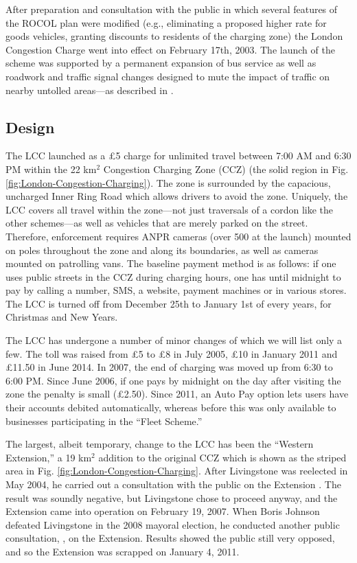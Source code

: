 After preparation and consultation with the public in which several features of the ROCOL plan were modified (e.g., eliminating a proposed higher rate for goods vehicles, granting discounts to residents of the charging zone) the London Congestion Charge went into effect on February 17th, 2003. The launch of the scheme was supported by a permanent expansion of bus service as well as roadwork and traffic signal changes designed to mute the impact of traffic on nearby untolled areas---as described in \cite[p. 132-135]{Richards2006}.

\subsection{Design}

The LCC launched as a \pounds5 charge for unlimited travel between 7:00 AM and 6:30 PM within the 22 km$^{2}$ Congestion Charging Zone (CCZ) (the solid region in Fig. \ref{fig:London-Congestion-Charging}). The zone is surrounded by the capacious, uncharged Inner Ring Road which allows drivers to avoid the zone. Uniquely, the LCC covers all travel within the zone---not just traversals of a cordon like the other schemes---as well as vehicles that are merely parked on the street. Therefore, enforcement requires ANPR cameras (over 500 at the launch) mounted on poles throughout the zone and along its boundaries, as well as cameras mounted on patrolling vans. The baseline payment method is as follows: if one uses public streets in the CCZ during charging hours, one has until midnight to pay by calling a number, SMS, a website, payment machines or in various stores. The LCC is turned off from December 25th to January 1st of every years, for Christmas and New Years.

The LCC has undergone a number of minor changes of which we will list only a few. The toll was raised from \pounds5 to \pounds8 in July 2005, \pounds10 in January 2011 and \pounds11.50 in June 2014. In 2007, the end of charging was moved up from 6:30 to 6:00 PM. Since June 2006, if one pays by midnight on the day after visiting the zone the penalty is small (\pounds 2.50). Since 2011, an Auto Pay option lets users have their accounts debited automatically, whereas before this was only available to businesses participating in the ``Fleet Scheme.''

The largest, albeit temporary, change to the LCC has been the ``Western Extension,'' a 19 km$^2$ addition to the original CCZ which is shown as the striped area in Fig. \ref{fig:London-Congestion-Charging}. After Livingstone was reelected in May 2004, he carried out a consultation with the public on the Extension \citep[Ch. 14]{Richards2006}. The result was soundly negative, but Livingstone chose to proceed anyway, and the Extension came into operation on February 19, 2007. When Boris Johnson defeated Livingstone in the 2008 mayoral election, he conducted another public consultation, \citet{TfL2008b}, on the  Extension. Results showed the public still very opposed, and so the Extension was scrapped on January 4, 2011.

